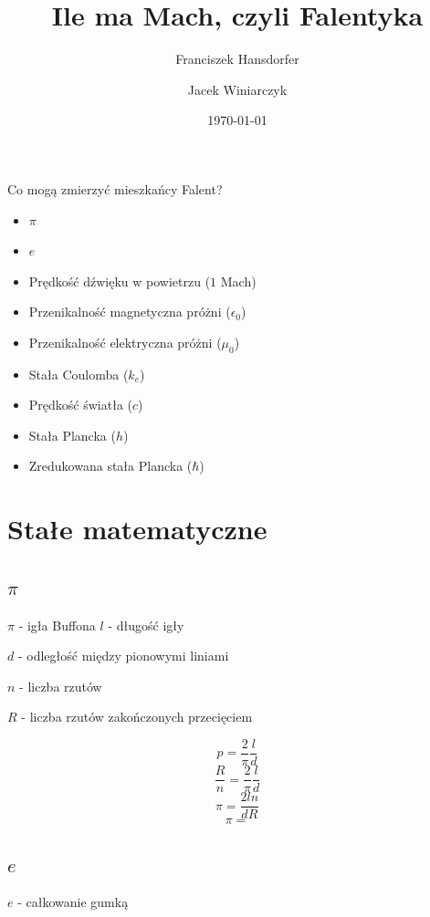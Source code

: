 \documentclass{beamer}
\title{Ile ma Mach, czyli Falentyka}
\author{Franciszek Hansdorfer \and Jacek Winiarczyk}
\institute{Wydiział fizyki doświadczalnej instytutu Marii Mach}
\date{\today}
\begin{document}
\begin{frame}
	\titlepage
\end{frame}

\begin{frame}{Co mogą zmierzyć mieszkańcy Falent?}
	\begin{itemize}
		\item $\pi$
		\item $e$
		\item Prędkość dźwięku w powietrzu ($1$ Mach)
		\item Przenikalność magnetyczna próżni ($\epsilon_0$)
		\item Przenikalność elektryczna próżni ($\mu_0$)
		\item Stała Coulomba ($k_e$)
		\item Prędkość światła ($c$)
		\item Stała Plancka ($h$)
		\item Zredukowana stała Plancka ($\hbar$)
	\end{itemize}

\end{frame}

\section{Stałe matematyczne}

\subsection{$\pi$}

\begin{frame}{$\pi$ - igła Buffona}
	$l$ - długość igły

	$d$ - odległość między pionowymi liniami

	$n$ - liczba rzutów

	$R$ - liczba rzutów zakończonych przecięciem

	$$p = \frac{2}{\pi} \frac{l}{d}$$
	$$\frac{R}{n} = \frac{2}{\pi}\frac{l}{d}$$
	$$\pi = \frac{2 l n}{d R}$$
	$$\pi =$$

\end{frame}

\subsection{$e$}

\begin{frame}{$e$ - całkowanie gumką}

\end{frame}
\end{document}
